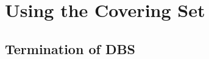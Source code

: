 \documentclass{beamer}
\begin{document}




\section{Using the Covering Set}

\subsection{Termination of DBS}
\end{document}
